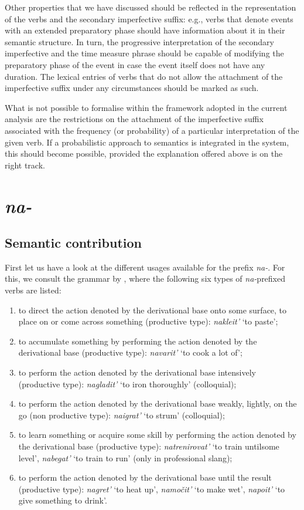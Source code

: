 Other properties that we have discussed should be reflected in the representation of the verbs and the secondary imperfective suffix: e.g., verbs that denote events with an extended preparatory phase should have information about it in their semantic structure. In turn, the progressive interpretation of the secondary imperfective and the time measure phrase should be capable of modifying the preparatory phase of the event in case the event itself does not have any duration. The lexical entries of verbs that do not allow the attachment of the imperfective suffix under any circumstances should be marked as such.

What is not possible to formalise within the framework adopted in the current analysis are the restrictions on the attachment of the imperfective suffix associated with the frequency (or probability) of a particular interpretation of the given verb. If a probabilistic approach to semantics is integrated in the system, this should become possible, provided the explanation offered above is on the right track.

\section{\textit{na-}}\label{subsection:semantics:na}
\subsection{Semantic contribution}
First let us have a look at the different usages available for the prefix \textit{na-}. For this, we consult the grammar by \citet[360]{Shvedova:82}, where the following six types of \textit{na-}prefixed verbs are listed:
\begin{enumerate}
\item to direct the action denoted by the derivational base onto some surface, to place on or come across something (productive type): \textit{nakleit'} `to paste';
\item to accumulate something by performing the action denoted by the derivational base (productive type): \textit{navarit'} `to cook a lot of';
\item to perform the action denoted by the derivational base intensively (productive type): \textit{nagladit'} `to iron thoroughly' (colloquial);
\item to perform the action denoted by the derivational base weakly, lightly, on the go (non productive type): \textit{naigrat'} `to strum' (colloquial);
\item to learn something or acquire some skill by performing the action denoted by the derivational base (productive type): \textit{natrenirovat'} `to train until\linebreak some level', \textit{nabegat'} `to train to run' (only in professional slang);
\item to perform the action denoted by the derivational base until the result (productive type): \textit{nagret'} `to heat up', \textit{namo\v{c}it'} `to make wet', \textit{napoit'} `to give something to drink'.
\end{enumerate}

